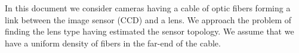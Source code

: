 In this document we consider cameras having a cable of optic fibers forming a link between the image sensor (CCD) and a lens. We approach the problem of finding the lens type having estimated the sensor topology. We assume that we have a uniform density of fibers in the far-end of the cable.